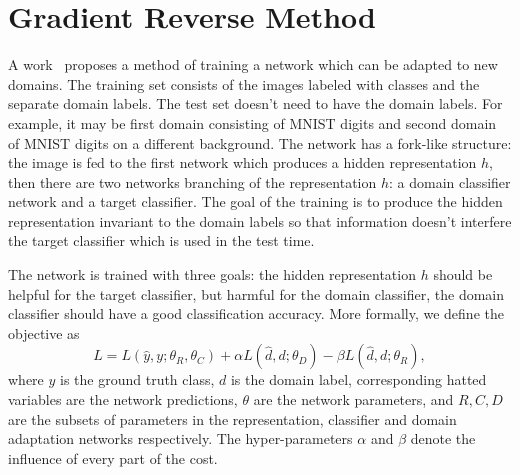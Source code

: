\documentclass{article}
\begin{document}
\section{Gradient Reverse Method}
\label{sec:gradient-reverse}

    A work~\cite{ganin2014unsupervised} proposes a method of training a network 
    which can be adapted to new domains. The training set consists of the images
    labeled with classes and the separate domain labels. The test set doesn't need
    to have the domain labels. For example, it may be first domain
    consisting of MNIST digits and second domain of MNIST digits on a different
    background. The network has a fork-like structure: the image is fed to the
    first network which produces a hidden representation $h$, then there are two
    networks branching of the representation $h$: a domain classifier network and 
    a target classifier. The goal of the training is to produce the hidden 
    representation invariant to the domain labels so that information doesn't 
    interfere the target classifier which is used in the test time.

    The network is trained with three goals: the hidden representation $h$ should
    be helpful for the target classifier, but harmful for the domain classifier,
    the domain classifier should have a good classification accuracy. More 
    formally, we define the objective as
    \begin{equation}
        L = L(\hat{y}, y; \theta_R, \theta_C) + 
        \alpha L(\hat{d}, d; \theta_D) -
        \beta L(\hat{d}, d; \theta_R),
    \end{equation}
    where $y$ is the ground truth class, $d$ is the domain label, corresponding
    hatted variables are the network predictions, $\theta$ are the network 
    parameters, and $R, C, D$ are the subsets of parameters in the representation,
    classifier and domain adaptation networks respectively. The hyper-parameters
    $\alpha$ and $\beta$ denote the influence of every part of the cost.




\end{document}
